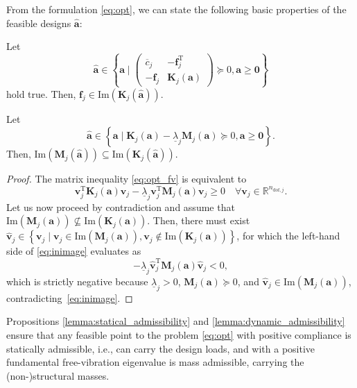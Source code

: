 \documentclass[final,onefignum,onetabnum]{siamart220329}
\newtheorem*{proof}{Proof}%
\begin{document}
From the formulation \eqref{eq:opt}, we can state the following basic properties of the feasible designs $\hat{\mathbf{a}}$:
%
\begin{proposition}\label{lemma:statical_admissibility}
	Let $$\mathbf{\hat{a}} \in \left\{\mathbf{a} \; \vert \; \begin{pmatrix}
		\overline{c}_j & -\mathbf{f}_j^\mathrm{T}\\
		-\mathbf{f}_j & \mathbf{K}_j(\mathbf{a})
	\end{pmatrix} \succeq 0, \mathbf{a}\ge \mathbf{0}\right\}$$ hold true. Then, $\mathbf{f}_j \in \mathrm{Im}\left(\mathbf{K}_j(\hat{\mathbf{a}})\right)$.
\end{proposition}
%
\begin{proposition}\label{lemma:dynamic_admissibility}
	Let $$\mathbf{\hat{a}}\in\left\{\mathbf{a} \; \vert \; \mathbf{K}_j(\mathbf{a}) - \underline{\lambda}_j \mathbf{M}_j(\mathbf{a}) \succeq 0, \mathbf{a}\ge \mathbf{0}\right\}.$$ Then, $\mathrm{Im}\left(\mathbf{M}_j(\hat{\mathbf{a}})\right) \subseteq \mathrm{Im}\left(\mathbf{K}_j(\hat{\mathbf{a}})\right)$.
\end{proposition}
\begin{proof}
	The matrix inequality \eqref{eq:opt_fv} is equivalent to
	\begin{equation}\label{eq:inimage}
		\mathbf{v}_j^\mathrm{T}\mathbf{K}_j(\mathbf{a})\mathbf{v}_j - \underline{\lambda}_j \mathbf{v}_j^\mathrm{T}\mathbf{M}_j(\mathbf{a})\mathbf{v}_j\ge 0\quad \forall \mathbf{v}_j \in \mathbb{R}^{n_{\mathrm{dof},j}}.
	\end{equation}
	Let us now proceed by contradiction and assume that $\mathrm{Im}\left(\mathbf{M}_j(\mathbf{a})\right) \nsubseteq \mathrm{Im}\left(\mathbf{K}_j(\mathbf{a})\right)$. Then, there must exist $\hat{\mathbf{v}}_j\in\left\{\mathbf{v}_j\;\vert\; \mathbf{v}_j\in \mathrm{Im}\left(\mathbf{M}_j(\mathbf{a})\right), \mathbf{v}_j\notin \mathrm{Im}\left(\mathbf{K}_j(\mathbf{a})\right)\right\}$, for which the left-hand side of \eqref{eq:inimage} evaluates as
	\begin{equation}
		-\underline{\lambda}_j \hat{\mathbf{v}}_j^\mathrm{T}\mathbf{M}_j(\mathbf{a})\hat{\mathbf{v}}_j < 0,
	\end{equation}
	which is strictly negative because $\underline{\lambda}_j>0$, $\mathbf{M}_j(\mathbf{a}) \succeq 0$, and $\hat{\mathbf{v}}_j\in \mathrm{Im}\left(\mathbf{M}_j(\mathbf{a})\right)$, contradicting~\eqref{eq:inimage}.
\end{proof}
%
Propositions \ref{lemma:statical_admissibility} and \ref{lemma:dynamic_admissibility} ensure that any feasible point to the problem \eqref{eq:opt} {with positive compliance} is statically admissible, i.e., can carry the design loads, {and with a positive fundamental free-vibration eigenvalue is} mass admissible, carrying the (non-)structural masses.
\end{document}
